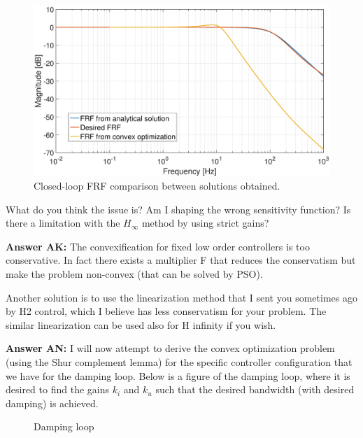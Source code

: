 \documentclass[12pt]{article}
\begin{document}
\begin{figure}
\centering
\includegraphics[width=\columnwidth]{pics/voltage_loop.eps}
\caption{Closed-loop FRF comparison between solutions obtained.}
\label{fig:volt_comp}
\end{figure}

What do you think the issue is? Am I shaping the wrong sensitivity function? Is there a limitation with the $H_\infty$ method by using strict gains? 

{\bf Answer AK:} The convexification for fixed low order controllers is too conservative. In fact there exists a multiplier F that reduces the conservatism but make the problem non-convex (that can be solved by PSO).

Another solution is to use the linearization method that I sent you sometimes ago by H2 control, which I believe has less conservatism for your problem. The similar linearization can be used also for H infinity if you wish.

{\bf Answer AN:} I will now attempt to derive the convex optimization problem (using the Shur complement lemma) for the specific controller configuration that we have for the damping loop. Below is a figure of the damping loop, where it is desired to find the gains $k_i$ and $k_u$ such that the desired bandwidth (with desired damping) is achieved. 
\begin{figure}
\centering
\resizebox{1\columnwidth}{!}{}
\caption{Damping loop}
\label{fig:damping_loop}
\end{figure}
\end{document}
